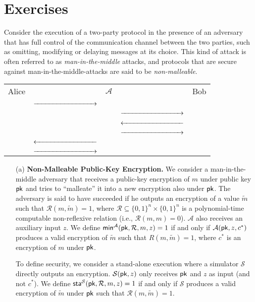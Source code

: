 \section*{Exercises}
\begin{exercise}
Consider the execution of a two-party protocol in the presence of an adversary that has full control of the communication channel between the two parties, such as omitting, modifying or delaying messages at its choice. This kind of attack is often referred to as \emph{man-in-the-middle} attacks, and protocols that are secure against man-in-the-middle-attacks are said to be \emph{non-malleable}.


\begin{table}[h]
\centering
\begin{tabular}{ r c c c l}
Alice &  & $\mathcal{A}$ &  & Bob\\
& $\xrightarrow{\parbox{3cm}{\ }}$ \\
&  & & $\xrightarrow{\parbox{3cm}{\ }}$ \\
&  & & $\xleftarrow{\parbox{3cm}{\ }}$ \\
&  & & $\xrightarrow{\parbox{3cm}{\ }}$ \\
& $\xleftarrow{\parbox{3cm}{\ }}$ \\
& $\xrightarrow{\parbox{3cm}{\ }}$
\end{tabular}
\end{table}

\begin{enumerate}
\item[(a)]
\textbf{Non-Malleable Public-Key Encryption.}
We consider a man-in-the-middle adversary that receives a public-key encryption of $m$ under public key $\mathsf{pk}$ and tries to ``malleate'' it into a new encryption also under $\mathsf{pk}$.
The adversary is said to have succeeded if he outputs an encryption of a value $\tilde m$ such that $\mathcal{R}(m, \tilde m)=1$, where $\mathcal{R} \subseteq \{0,1\}^n \times \{0,1\}^n$ is a polynomial-time computable non-reflexive relation (i.e., $\mathcal{R}(m,m)=0$). $\mathcal{A}$ also receives an auxiliary input $z$. We define $\mathsf{min}^{\mathcal{A}}(\mathsf{pk}, \mathcal{R}, m,z)=1$ if and only if $\mathcal{A}(\mathsf{pk},z,c^*)$ produces a valid encryption of $\tilde m$ such that $R(m, \tilde m) = 1$, where $c^*$ is an encryption of $m$ under $\mathsf{pk}$.

To define security, we consider a stand-alone execution where a simulator $\mathcal{S}$ directly outputs an encryption. $\mathcal{S}(\mathsf{pk},z)$ only receives $\mathsf{pk}$ and $z$ as input (and not $c^*$). We define $\mathsf{sta}^{\mathcal{S}}(\mathsf{pk}, \mathcal{R}, m, z) = 1$ if and only if $\mathcal{S}$ produces a valid encryption of $\tilde m$ under $\mathsf{pk}$ such that $\mathcal{R}(m, \tilde m) = 1$.


\end{enumerate}
\end{exercise}
